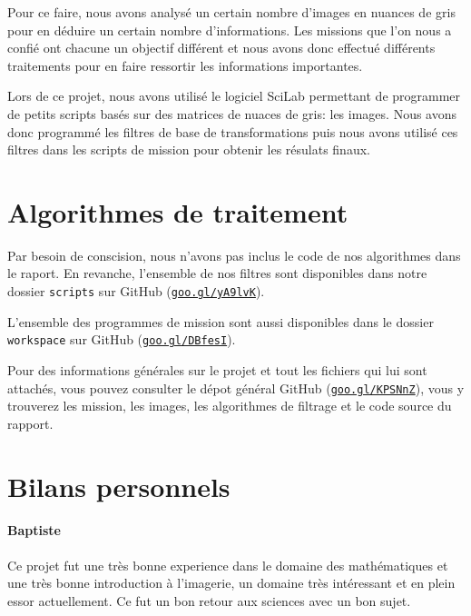 \documentclass[12pt]{article}
\begin{document}
Pour ce faire, nous avons analysé un certain nombre d'images en nuances de gris pour en déduire un certain nombre d'informations. Les missions que l'on nous a confié ont chacune un objectif différent et nous avons donc effectué différents traitements pour en faire ressortir les informations importantes.

Lors de ce projet, nous avons utilisé le logiciel SciLab permettant de programmer de petits scripts basés sur des matrices de nuaces de gris: les images. Nous avons donc programmé les filtres de base de transformations puis nous avons utilisé ces filtres dans les scripts de mission pour obtenir les résulats finaux.

\clearpage

\clearpage

\clearpage

\clearpage

\clearpage

\clearpage

\clearpage

\clearpage

\clearpage

\clearpage

\clearpage

\clearpage

\clearpage

\section{Algorithmes de traitement}

Par besoin de conscision, nous n'avons pas inclus le code de nos algorithmes dans le raport. En revanche, l'ensemble de nos filtres sont disponibles dans notre dossier \texttt{scripts} sur GitHub (\href{https://github.com/Exia-epickiwi/exolife/tree/master/scripts}{\texttt{goo.gl/yA9lvK}}).

L'ensemble des programmes de mission sont aussi disponibles dans le dossier \texttt{workspace} sur GitHub (\href{https://github.com/Exia-epickiwi/exolife/tree/master/workspace}{\texttt{goo.gl/DBfesI}}).

Pour des informations générales sur le projet et tout les fichiers qui lui sont attachés, vous pouvez consulter le dépot général GitHub (\href{https://github.com/Exia-epickiwi/exolife}{\texttt{goo.gl/KPSNnZ}}), vous y trouverez les mission, les images, les algorithmes de filtrage et le code source du rapport.

\section{Bilans personnels}

\paragraph{ Baptiste} Ce projet fut une très bonne experience dans le domaine des mathématiques et une très bonne introduction à l'imagerie, un domaine très intéressant et en plein essor actuellement. Ce fut un bon retour aux sciences avec un bon sujet.
\end{document}
